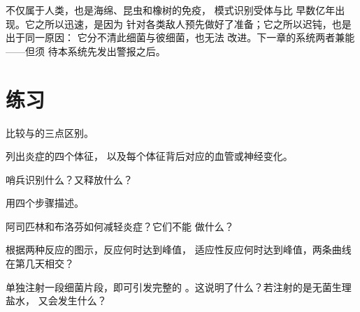 \begin{remark}[古老、迅速而迟钝]\label{rem:g12:innate-immunity:old}
不仅属于人类，也是海绵、昆虫和橡树的免疫，
模式识别受体与比
早数亿年出现。它之所以迅速，是因为
针对各类敌人预先做好了准备；它之所以迟钝，也是出于同一原因：
它分不清此细菌与彼细菌，也无法
改进。下一章的系统两者兼能——但须
待本系统先发出警报之后。
\end{remark}

\section{练习}

\begin{exercise}[$\star$]\label{exo:g12:innate-immunity:1}
比较与的三点区别。
\end{exercise}

\begin{exercise}[$\star$]\label{exo:g12:innate-immunity:2}
列出炎症的四个体征，
以及每个体征背后对应的血管或神经变化。
\end{exercise}

\begin{exercise}[$\star$]\label{exo:g12:innate-immunity:3}
哨兵识别什么？又释放什么？
\end{exercise}

\begin{exercise}[$\star$]\label{exo:g12:innate-immunity:4}
用四个步骤描述。
\end{exercise}

\begin{exercise}[$\star$]\label{exo:g12:innate-immunity:5}
阿司匹林和布洛芬如何减轻炎症？它们不能
做什么？
\end{exercise}

\begin{exercise}[$\star\star$]\label{exo:g12:innate-immunity:6}
根据两种反应的图示，反应何时达到峰值，
适应性反应何时达到峰值，两条曲线在第几天相交？
\end{exercise}

\begin{exercise}[$\star\star$]\label{exo:g12:innate-immunity:7}
单独注射一段细菌片段，即可引发完整的
。这说明了什么？若注射的是无菌生理盐水，
又会发生什么？
\end{exercise}

